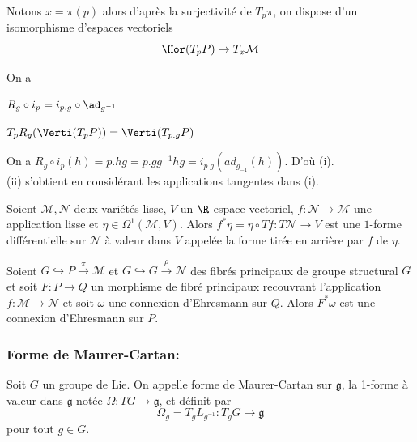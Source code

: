\begin{pro}
Notons $x = \pi(p)$ alors d'après la surjectivité de $T_p\pi$, on dispose d'un isomorphisme d'espaces vectoriels
$$\Hor(T_pP) \to T_x\mathcal{M}$$
\end{pro}

\begin{pro}
On a 
\be
	\item $R_g \circ i_p = i_{p.g} \circ \ad_{g^{-1}}$
	\item $T_pR_g(\Verti(T_pP)) = \Verti(T_{p.g}P)$
\ee
\end{pro}
\begin{preu}
On a $R_g \circ i_p(h) = p.hg = p.gg^{-1}hg = i_{p.g}(ad_{g_{-1}}(h))$. D'où (i).\\
(ii) s'obtient en considérant les applications tangentes dans (i).
\end{preu}

\begin{defi}
Soient $\mathcal{M}, \mathcal{N}$ deux variétés lisse, $V$ un $\R$-espace vectoriel, $f:\mathcal{N} \to \mathcal{M}$ une application lisse et $\eta \in \Omega^1(\mathcal{M}, V)$. Alors $f^*\eta = \eta \circ Tf : T\mathcal{N} \to V$ est une $1$-forme différentielle sur $\mathcal{N}$ à valeur dans $V$ appelée la forme tirée en arrière par $f$ de $\eta$. \\
\end{defi}

\begin{pro}
Soient $G \hookrightarrow P \overset{\pi}{\to} \mathcal{M}$ et $G \hookrightarrow G \overset{\rho}{\to} \mathcal{N}$ des fibrés principaux de groupe structural $G$ et soit $F: P\to Q$ un morphisme de fibré principaux recouvrant l'application $f: \mathcal{M} \to \mathcal{N}$ et soit $\omega$ une connexion d'Ehresmann sur $Q$. Alors $F^*\omega$ est une connexion d'Ehresmann sur $P$.
\end{pro}

\subsubsection{Forme de Maurer-Cartan:}

\begin{defi}
Soit $G$ un groupe de Lie. On appelle forme de Maurer-Cartan sur $\mathfrak{g}$, la 1-forme à valeur dans $\mathfrak{g}$ notée $\Omega : TG \to \mathfrak{g}$, et définit par 
$$\Omega_g = T_gL_{g^{-1}} : T_gG \to \mathfrak{g}$$
pour tout $g\in G$.
\end{defi}

